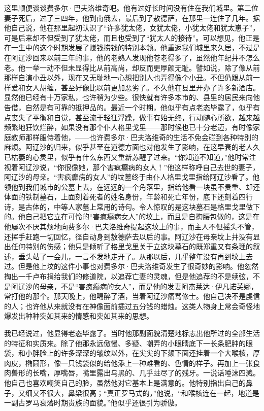 \par 这里顺便谈谈费多尔·巴夫洛维奇吧。他有过好长时间没有住在我们城里。第二位妻子死后，过了三四年，他到南俄去，最后到了敖德萨，在那里一连住了几年。据他自己说，他在那里起初认识了“许多犹太佬，女犹太佬，小犹太佬和犹太崽子”，可是后来却不但受到了犹太佬，而且也受到了“犹太人的接待”。可以想见，他正是在一生中的这个时期发展了赚钱捞钱的特别本领。他重返我们城里来久居，不过是在阿辽沙回来以前三年的事，他的老熟人发现他苍老得多了，虽然他年纪并不怎么老。他一举一动不但未显得比从前高尚，却反而更厚颜无耻。譬如说，除了像从前那样自演小丑以外，现在又无耻地一心想把别人也弄得像个小丑。不但仍跟从前一样爱和女人胡缠，甚至好像比以前更加恶劣了。不久他在县里开办了许多新酒店。显然他已经有十万家私，也许稍为少些。很快就有许多本市的、县里的居民来向他告借，自然是有可靠的抵押品的。最近一个时期，他似乎有点老态毕露了，似乎有点丧失了平衡和自觉，甚至流于轻狂浮躁，做事有始无终，行动随心所欲，越来越频繁地狂饮烂醉，如果没有那个仆人格里戈里——那时候也已十分老迈，有时像家庭教师那样服侍着他，——也许费多尔·巴夫洛维奇的生活不免会碰到各种特别的麻烦。阿辽沙的归来，似乎甚至在道德方面也对他发生了影响，在这早衰的老人久已枯萎的心灵里，似乎有什么东西又重新苏醒了过来。“你知道不知道，”他时常注视着阿辽沙说，“你很像她，那个害疯癫病的女人！”他这样称呼自己去世的妻子，阿辽沙的母亲。“害疯癫病的女人”的坟墓终于由仆人格里戈里指给阿辽沙看了。他领他到我们城市的公墓上去，在远远的一个角落里，指给他看一块虽不贵重、却还体面的铁制墓石，上面刻着死者的姓名身份，年龄和死亡年份，底下还刻着四行诗，是古体的，中等人家墓上常用的诗句。令人惊叹的是这块墓石是格里戈里做下的。他自己把它立在可怜的“害疯癫病女人”的坟上，而且是自掏腰包做的，这是在他屡次不厌其烦地向费多尔·巴夫洛维奇提起这坟上的事，而主人不但摇头不管，还挥手赶跑一切回忆，径自动身到敖德萨去以后的事。阿辽沙在母亲坟上并没有显出任何特别的伤感；他只是倾听了格里戈里关于立这块墓石的既郑重又有条理的叙述，垂头站了一会儿，一言不发地走开了。从那以后，几乎整年没有再到坟上去过。但是他上坟的这件小事也对费多尔·巴夫洛维奇发生了很奇妙的影响。他忽然掏出一千卢布捐给我们的修道院，以追荐亡妻的灵魂，但是他追荐的不是续弦，不是阿辽沙的母亲，不是“害疯癫病的女人”，而是他的发妻阿杰莱达·伊凡诺芙娜，常打他的那个。那天晚上，他喝醉了酒，当着阿辽沙痛骂修士。他自己决不是虔信的人；也许他从来就没有在神像面前插过五分钱的蜡烛。这类人物身上常会奇怪地爆发出种种突如其来的情感和突如其来的思想。
\par 我已经说过，他显得老态毕露了。当时他那副面貌清楚地标志出他所过的全部生活的特征和实质来。除了他那永远傲慢、多疑、嘲弄的小眼睛底下一长条肥肿的眼袋，和小胖脸上的许多深深的皱纹以外，在尖尖的下颏下面还挂着一个大喉核，厚肉皮，椭圆形，像一只钱袋似的给他添上一种难看的、色情的样子。再加上一张食肉兽形的长嘴，厚嘴唇，嘴里露出乌黑的、几乎蛀尽了的残牙。一说话唾沫四溅。他自己也喜欢嘲笑自己的脸，虽然他对它基本上是满意的。他特别指出自己的鼻子，又细又不很大，鼻梁很高；“真正罗马式的，”他说，“和喉核连在一起，地道是一副古罗马衰落时期贵族的面貌。”他似乎还很引为骄傲。
